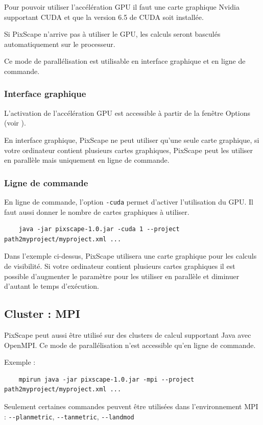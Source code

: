 \documentclass{report}
\begin{document}
Pour pouvoir utiliser l'accélération GPU il faut une carte graphique Nvidia supportant CUDA et que la version 6.5 de CUDA soit installée. 

Si PixScape n'arrive pas à utiliser le GPU, les calculs seront basculés automatiquement sur le processeur.

Ce mode de parallélisation est utilisable en interface graphique et en ligne de commande.

\subsubsection{Interface graphique}

L'activation de l'accélération GPU est accessible à partir de la fenêtre Options (voir ).

En interface graphique, PixScape ne peut utiliser qu'une seule carte graphique, si votre ordinateur contient plusieurs cartes graphiques, PixScape peut les utiliser en parallèle mais uniquement en ligne de commande.

\subsubsection{Ligne de commande}
En ligne de commande, l'option \verb|-cuda| permet d'activer l'utilisation du GPU. Il faut aussi donner le nombre de cartes graphiques à utiliser.

\begin{Verbatim}
	java -jar pixscape-1.0.jar -cuda 1 --project path2myproject/myproject.xml ...
\end{Verbatim}
Dans l'exemple ci-dessus, PixScape utilisera une carte graphique pour les calculs de visibilité. Si votre ordinateur contient plusieurs cartes graphiques il est possible d'augmenter le paramètre pour les utiliser en parallèle et diminuer d'autant le temps d'exécution.


\subsection{Cluster : MPI}
PixScape peut aussi être utilisé sur des clusters de calcul supportant Java avec OpenMPI. Ce mode de parallélisation n'est accessible qu'en ligne de commande.

Exemple :
\begin{Verbatim}
	mpirun java -jar pixscape-1.0.jar -mpi --project path2myproject/myproject.xml ...
\end{Verbatim}
Seulement certaines commandes peuvent être utilisées dans l'environnement MPI : \verb|--planmetric|, \verb|--tanmetric|, \verb|--landmod|
\end{document}
